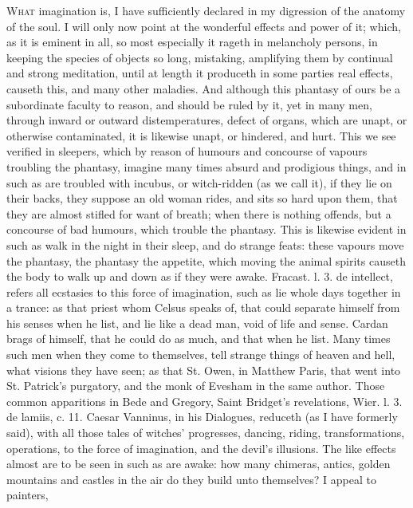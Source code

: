 {\lettrine{W}{hat} imagination is, I have sufficiently declared in my digression of
the anatomy of the soul. I will only now point at the wonderful effects
and power of it; which, as it is eminent in all, so most especially it
rageth in melancholy persons, in keeping the species of objects so
long, mistaking, amplifying them by continual and strong
meditation, until at length it produceth in some parties real effects,
causeth this, and many other maladies. And although this phantasy of
ours be a subordinate faculty to reason, and should be ruled by it, yet
in many men, through inward or outward distemperatures, defect of
organs, which are unapt, or otherwise contaminated, it is likewise
unapt, or hindered, and hurt. This we see verified in sleepers, which
by reason of humours and concourse of vapours troubling the phantasy,
imagine many times absurd and prodigious things, and in such as are
troubled with incubus, or witch-ridden (as we call it), if they lie on
their backs, they suppose an old woman rides, and sits so hard upon
them, that they are almost stifled for want of breath; when there is
nothing offends, but a concourse of bad humours, which trouble the
phantasy. This is likewise evident in such as walk in the night in
their sleep, and do strange feats: these vapours move the
phantasy, the phantasy the appetite, which moving the animal spirits
causeth the body to walk up and down as if they were awake. Fracast. l.
3. de intellect, refers all ecstasies to this force of imagination,
such as lie whole days together in a trance: as that priest whom
Celsus speaks of, that could separate himself from his senses
when he list, and lie like a dead man, void of life and sense. Cardan
brags of himself, that he could do as much, and that when he list. Many
times such men when they come to themselves, tell strange things of
heaven and hell, what visions they have seen; as that St. Owen, in
Matthew Paris, that went into St. Patrick's purgatory, and the monk of
Evesham in the same author. Those common apparitions in Bede and
Gregory, Saint Bridget's revelations, Wier. l. 3. de lamiis, c. 11.
Caesar Vanninus, in his Dialogues, \etc{} reduceth (as I have formerly
said), with all those tales of witches' progresses, dancing, riding,
transformations, operations, \etc{} to the force of  imagination,
and the devil's illusions. The like effects almost are to be seen
in such as are awake: how many chimeras, antics, golden mountains and
castles in the air do they build unto themselves? I appeal to painters,
}
